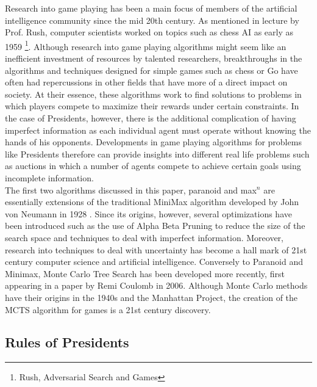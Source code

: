 \documentclass[11pt]{article}
\begin{document}
Research into game playing has been a main focus of members of the artificial intelligence community since the mid 20th century. As mentioned in lecture by Prof. Rush, computer scientists worked on topics such as chess AI as early as 1959 \footnote{Rush, Adversarial Search and Games}. Although research into game playing algorithms might seem like an inefficient investment of resources by talented researchers, breakthroughs in the algorithms and techniques designed for  simple games such as chess or Go have often had repercussions in other fields that have more of a direct impact on society. At their essence, these algorithms work to find solutions to problems in which players compete to maximize their rewards under certain constraints. In the case of Presidents, however, there is the additional complication of having imperfect information as each individual agent must operate without knowing the hands of his opponents. Developments in game playing algorithms for problems like Presidents therefore can provide insights into different real life problems such as auctions in which a number of agents compete to achieve certain goals using incomplete information.\\

The first two algorithms discussed in this paper, paranoid and max$^n$ are essentially extensions of the traditional MiniMax algorithm developed by John von Neumann in 1928 \cite{kjeldsen01}. Since its origins, however, several optimizations have been introduced such as the use of Alpha Beta Pruning to reduce the size of the search space and techniques to deal with imperfect information. Moreover, research into techniques to deal with uncertainty has become a hall mark of 21st century computer science and artificial intelligence. Conversely to Paranoid and Minimax, Monte Carlo Tree Search has been developed more recently, first appearing in a paper by Remi Coulomb in 2006. Although Monte Carlo methods have their origins in the 1940s and the Manhattan Project, the creation of the MCTS algorithm for games is a 21st century discovery.


\subsection{Rules of Presidents}
\end{document}
